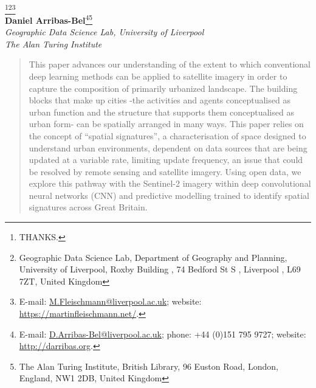 \documentclass[pdftex,letterpaper,11pt]{article}%
\begin{document}
\begin{titlepage}
\vspace*{1ex}
\begin{minipage}{\textwidth}
\begin{center}%

    {}\\[4ex]%

{\Large{}\footnote[1]{THANKS.}\footnote[2]{Geographic
Data Science Lab, Department of Geography and Planning, University of
Liverpool, Roxby Building , 74 Bedford St S , Liverpool , L69 7ZT, United
Kingdom}\footnote[4]{
E-mail: \url{M.Fleischmann@liverpool.ac.uk}; website: \url{https://martinfleischmann.net/}.}}\\[1mm]
%
{\Large\textbf{Daniel Arribas-Bel}\footnotemark[1]\footnotemark[2]\footnote[3]{E-mail: \url{D.Arribas-Bel@liverpool.ac.uk}; phone: +44 (0)151 795 9727; website: \url{http://darribas.org}.
}}\footnote[5]{The Alan Turing Institute, British Library, 96 Euston Road, London, England, NW1 2DB, United Kingdom}
\\[1mm]
{\large\textit{Geographic Data Science Lab, University of Liverpool} }\\
{\large\textit{The Alan Turing Institute} }\\[2.5ex]
%
\date{\today}\vspace{1.5ex}
%
\end{center}
%
\begin{abstract}
    This paper advances our understanding of the extent to which conventional deep learning
    methods can be applied to satellite imagery in order to capture the composition of
    primarily urbanized landscape.
    The building blocks that make up cities -the activities and agents conceptualised as
    urban function and the structure that supports them conceptualised as urban form-
    can be spatially arranged in many ways. This paper relies on the concept of
    ``spatial signatures'', a characterisation of space designed to understand urban
    environments, dependent on data sources that are being updated at a variable rate,
    limiting update frequency, an issue that could be resolved by
    remote sensing and satellite imagery. Using open data, we explore this pathway with
    the Sentinel-2 imagery within deep convolutional neural networks (CNN) and
    predictive modelling trained to identify spatial signatures across Great Britain.

\end{abstract}
\end{minipage}
\end{titlepage}
\end{document}

